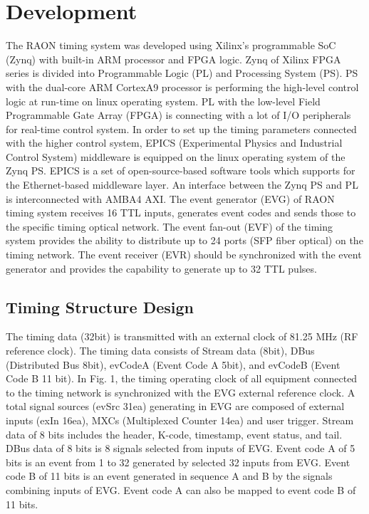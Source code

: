 \documentclass[journal]{IEEEtran}
\begin{document}
\section{Development}
The RAON timing system was developed using Xilinx’s programmable SoC (Zynq) with built-in ARM processor and FPGA logic. Zynq of Xilinx FPGA series is divided into Programmable Logic (PL) and Processing System (PS). PS with the dual-core ARM CortexA9 processor is performing the high-level control logic at run-time on linux operating system. PL with the low-level Field Programmable Gate Array (FPGA) is connecting with a lot of I/O peripherals for real-time control system. In order to set up the timing parameters connected with the higher control system, EPICS (Experimental Physics and Industrial Control System) middleware is equipped on the linux operating system of the Zynq PS. EPICS is a set of open-source-based software tools which supports for the Ethernet-based middleware layer. An interface between the Zynq PS and PL is interconnected with AMBA4 AXI. The event generator (EVG) of RAON timing system receives 16 TTL inputs, generates event codes and sends those to the specific timing optical network. The event fan-out (EVF) of the timing system provides the ability to distribute up to 24 ports (SFP fiber optical) on the timing network. The event receiver (EVR) should be synchronized with the event generator and provides the capability to generate up to 32 TTL pulses. 

\subsection{Timing Structure Design}
The timing data (32bit) is transmitted with an external clock of 81.25 MHz (RF reference clock). The timing data consists of Stream data (8bit), DBus (Distributed Bus 8bit), evCodeA (Event Code A 5bit), and evCodeB (Event Code B 11 bit). In Fig. 1, the timing operating clock of all equipment connected to the timing network is synchronized with the EVG external reference clock. A total signal sources (evSrc 31ea) generating in EVG are composed of external inputs (exIn 16ea), MXCs (Multiplexed Counter 14ea) and user trigger. Stream data of 8 bits includes the header, K-code, timestamp, event status, and tail. DBus data of 8 bits is 8 signals selected from inputs of EVG. Event code A of 5 bits is an event from 1 to 32 generated by selected 32 inputs from EVG. Event code B of 11 bits is an event generated in sequence A and B by the signals combining inputs of EVG. Event code A can also be mapped to event code B of 11 bits.
\end{document}
